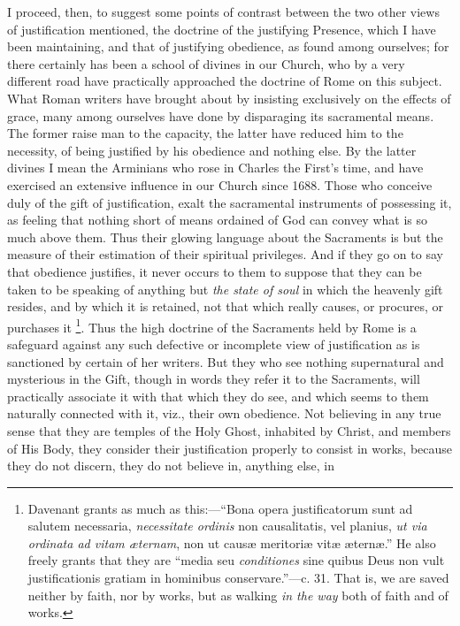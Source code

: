 I proceed, then, to suggest some points of contrast between the two
other views of justification mentioned, the doctrine of the justifying
Presence, which I have been maintaining, and that of justifying
obedience, as found among ourselves; for there certainly has been a
school of divines in our Church, who by a very different road have
practically approached the doctrine of Rome on this subject. What
Roman writers have brought about by insisting exclusively on the
effects of grace, many among ourselves have done by disparaging its
sacramental means. The former raise man to the capacity, the latter
have reduced him to the necessity, of being justified by his obedience
and nothing else. By the latter divines I mean the Arminians who rose
in Charles the First's time, and have exercised an extensive influence
in our Church since 1688. Those who conceive duly of the gift of
justification, exalt the sacramental instruments of possessing it, as
feeling that nothing short of means ordained of God can convey what is
so much above them. Thus their glowing language about the Sacraments
is but the measure of their estimation of their spiritual privileges.
And if they go on to say that obedience justifies, it never occurs to
them to suppose that they can be taken to be speaking of
anything but \emph{the state of soul} in which the heavenly gift
resides, and by which it is retained, not that which really causes, or
procures, or purchases it \footnote{Davenant grants
as much as this:—``Bona opera justificatorum sunt ad salutem
necessaria, \emph{necessitate ordinis} non causalitatis, vel planius, \emph{ut
via ordinata ad vitam æternam}, non ut causæ meritoriæ vitæ
æternæ.'' He also freely grants that they are ``media seu \emph{conditiones}
sine quibus Deus non vult justificationis gratiam in hominibus
conservare.''—c. 31. That is, we are saved neither by faith, nor
by works, but as walking \emph{in the way} both of faith and of works.}.
Thus the high doctrine of the Sacraments held by Rome is a safeguard
against any such defective or incomplete view of justification as is
sanctioned by certain of her writers. But they who see nothing
supernatural and mysterious in the Gift, though in words they refer it
to the Sacraments, will practically associate it with that which they
do see, and which seems to them naturally connected with it, viz.,
their own obedience. Not believing in any true sense that they are
temples of the Holy Ghost, inhabited by Christ, and members of His
Body, they consider their justification properly to consist in works,
because they do not discern, they do not believe in, anything else, in
